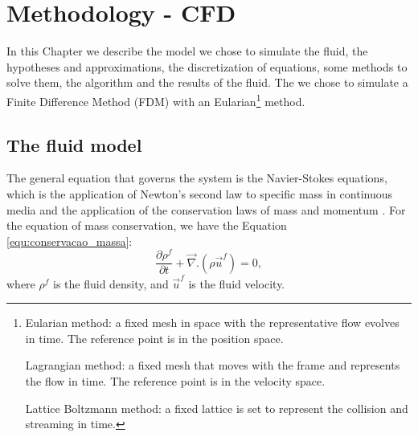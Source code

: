 \chapter{Methodology - CFD}
\label{chap:CFD}

    In this Chapter we describe the model we chose to simulate the fluid, the hypotheses and approximations, the discretization of equations, some methods to solve them, the algorithm and the results of the fluid. The we chose to simulate a Finite Difference Method (FDM) with an Eularian\footnote{
    Eularian method: a fixed mesh in space with the representative flow evolves in time. The reference point is in the position space.

    Lagrangian method: a fixed mesh that moves with the frame and represents the flow in time. The reference point is in the velocity space.

    Lattice Boltzmann method: a fixed lattice is set to represent the collision and streaming in time.
} method.

\section{The fluid model}
    The general equation that governs the system is the Navier-Stokes equations, which is the application of Newton's second law to specific mass in continuous media and the application of the conservation laws of mass and momentum \cite{Physical_Hydrodynamics, Fluid_Mechanics}. For the equation of mass conservation, we have the Equation \ref{equ:conservacao_massa}: 
\begin{equation}
    \frac{\partial \rho^{f}}{\partial t} +\vec{\nabla}.(\rho \vec{u}^{f}) = 0,
    \label{equ:conservacao_massa}
\end{equation}
where $\rho^{f}$ is the fluid density, and $\vec{u}^{f}$ is the fluid velocity.

